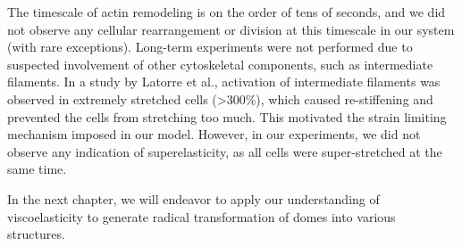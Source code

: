 The timescale of actin remodeling is on the order of tens of seconds,
and we did not observe any cellular rearrangement or division at this
timescale in our system (with rare exceptions). Long-term experiments
were not performed due to suspected involvement of other cytoskeletal
components, such as intermediate filaments. In a study by Latorre et
al., activation of intermediate filaments was observed in extremely
stretched cells (\textgreater300\%), which caused re-stiffening and
prevented the cells from stretching too much. This motivated the strain
limiting mechanism imposed in our model. However, in our experiments, we
did not observe any indication of superelasticity, as all cells were
super-stretched at the same time.

In the next chapter, we will endeavor to apply our understanding of
viscoelasticity to generate radical transformation of domes into various
structures.
